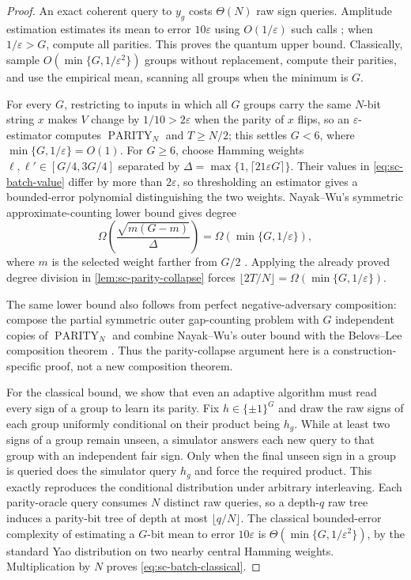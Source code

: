 \begin{proof}
An exact coherent query to $y_g$ costs $\Theta(N)$ raw sign queries.
Amplitude estimation estimates its mean to error $10\varepsilon$ using
$O(1/\varepsilon)$ such calls
\cite{brassard2002-quantum-amplitude-amplification-and-estimation}; when
$1/\varepsilon>G$, compute all parities.  This proves the quantum upper
bound.  Classically, sample
$O(\min\{G,1/\varepsilon^2\})$ groups without replacement, compute their
parities, and use the empirical mean, scanning all groups when the minimum
is $G$.

For every $G$, restricting to inputs in which all $G$ groups carry the same
$N$-bit string $x$ makes $V$ change by $1/10>2\varepsilon$ when the parity of
$x$ flips, so an $\varepsilon$-estimator computes
$\operatorname{PARITY}_N$ and $T\ge N/2$; this settles $G<6$, where
$\min\{G,1/\varepsilon\}=O(1)$.  For $G\ge6$, choose Hamming weights
$\ell,\ell'\in[G/4,3G/4]$ separated by
$\Delta=\max\{1,\lceil21\varepsilon G\rceil\}$.  Their values in
\eqref{eq:sc-batch-value} differ by more than $2\varepsilon$, so thresholding
an estimator gives a bounded-error polynomial distinguishing the two
weights.  Nayak--Wu's symmetric approximate-counting lower bound gives
degree
\[
 \Omega\!\left(\frac{\sqrt{m(G-m)}}{\Delta}\right)
 =\Omega(\min\{G,1/\varepsilon\}),
\]
where $m$ is the selected weight farther from $G/2$
\cite{nayak1999-the-quantum-query-complexity-of}.  Applying the already
proved degree division in \cref{lem:sc-parity-collapse} forces
$\lfloor2T/N\rfloor=\Omega(\min\{G,1/\varepsilon\})$.

The same lower bound also follows from perfect negative-adversary
composition: compose the partial symmetric outer gap-counting problem with
$G$ independent copies of $\operatorname{PARITY}_N$ and combine Nayak--Wu's outer bound with the
Belovs--Lee composition theorem
\cite{belovs2020-the-quantum-query-complexity-of}.  Thus the parity-collapse
argument here is a construction-specific proof, not a new composition
theorem.

For the classical bound, we show that even an adaptive algorithm must read
every sign of a group to learn its parity.  Fix $h\in\{\pm1\}^G$ and draw the raw
signs of each group uniformly conditional on their product being $h_g$.
While at least two signs of a group remain unseen, a simulator answers
each new query to that group with an independent fair sign.  Only when the
final unseen sign in a group is queried does the simulator query $h_g$ and
force the required product.
This exactly reproduces the conditional distribution under arbitrary
interleaving.  Each parity-oracle query consumes $N$ distinct raw queries,
so a depth-$q$ raw tree induces a parity-bit tree of depth at most
$\lfloor q/N\rfloor$.  The classical bounded-error complexity of estimating
a $G$-bit mean to error $10\varepsilon$ is
$\Theta(\min\{G,1/\varepsilon^2\})$, by the standard Yao distribution on
two nearby central Hamming weights.  Multiplication by $N$ proves
\eqref{eq:sc-batch-classical}.
\end{proof}

